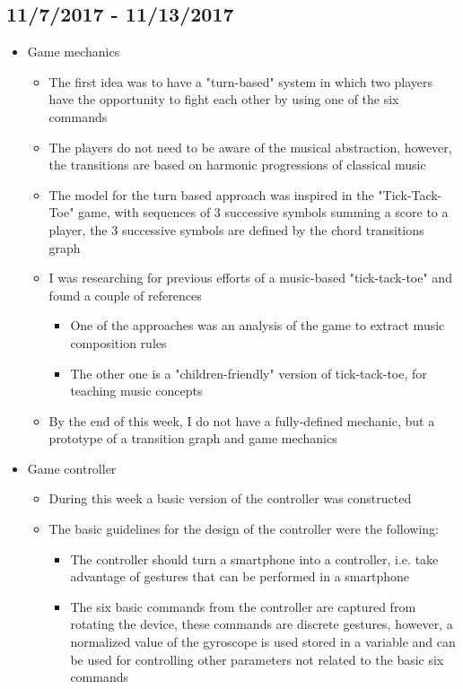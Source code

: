 	\subsection{11/7/2017 - 11/13/2017}
		\begin{itemize}
			\item Game mechanics
			\begin{itemize}
				\item The first idea was to have a "turn-based" system in which two players have the opportunity to fight each other by using one of the six commands
				\item The players do not need to be aware of the musical abstraction, however, the transitions are based on harmonic progressions of classical music
				\item The model for the turn based approach was inspired in the "Tick-Tack-Toe" game, with sequences of 3 successive symbols summing a score to a player, the 3 successive symbols are defined by the chord transitions graph
				\item I was researching for previous efforts of a music-based "tick-tack-toe" and found a couple of references
				\begin{itemize}
					\item One of the approaches was an analysis of the game to extract music composition rules
					\item The other one is a "children-friendly" version of tick-tack-toe, for teaching music concepts
				\end{itemize}
				\item By the end of this week, I do not have a fully-defined mechanic, but a prototype of a transition graph and game mechanics
			\end{itemize}
			\item Game controller
			\begin{itemize}
				\item During this week a basic version of the controller was constructed
				\item The basic guidelines for the design of the controller were the following:
				\begin{itemize}
					\item The controller should turn a smartphone into a controller, i.e. take advantage of gestures that can be performed in a smartphone
					\item The six basic commands from the controller are captured from rotating the device, these commands are discrete gestures, however, a normalized value of the gyroscope is used stored in a variable and can be used for controlling other parameters not related to the basic six commands

\end{itemize}
\end{itemize}
\end{itemize}
